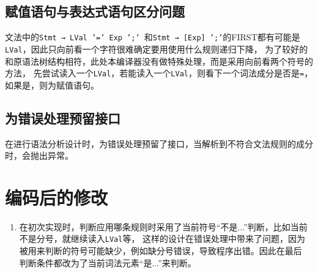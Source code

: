 \subsection{赋值语句与表达式语句区分问题}

文法中的\texttt{Stmt → LVal '=' Exp ';' }和\texttt{Stmt → [Exp] ';'}的FIRST都有可能是\texttt{LVal}，因此只向前看一个字符很难确定要用使用什么规则递归下降，
为了较好的和原语法树结构相符，此处本编译器没有做特殊处理，而是采用向前看两个符号的方法，
先尝试读入一个\texttt{LVal}，若能读入一个\texttt{LVal}，则看下一个词法成分是否是\texttt{=}，如果是，则为赋值语句。

\subsection{为错误处理预留接口}

在进行语法分析设计时，为错误处理预留了接口，当解析到不符合文法规则的成分时，会抛出异常。

\section{编码后的修改}

\begin{enumerate}
    \item 在初次实现时，判断应用哪条规则时采用了当前符号“不是...”判断，比如当前不是分号，就继续读入\texttt{LVal}等，
    这样的设计在错误处理中带来了问题，因为被用来判断的符号可能缺少，例如缺分号错误，导致程序出错。因此在最后
    判断条件都改为了当前词法元素“是...”来判断。
\end{enumerate}